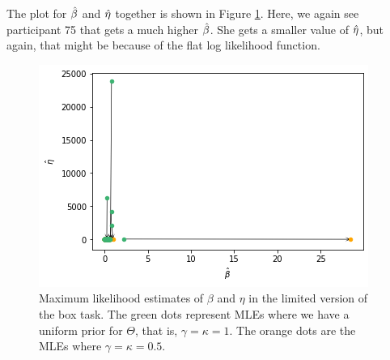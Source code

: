 The plot for $\hat{\beta}$ and $\hat{\eta}$ together is shown in Figure \ref{fig:sensitivity_mles_lim_b_e}. Here, we again see participant 75 that gets a much higher $\hat{\beta}$. She gets a smaller value of $\hat{\eta}$, but again, that might be because of the flat log likelihood function. 
\begin{figure}
    \centering
    \includegraphics[scale=0.8]{pictures/Sensitivity/mles_lim_b_e.png}
    \caption[MLEs of $\beta$ and $\eta$ for prior with $\gamma=\kappa=1$ and $\gamma=\kappa=0.5$, limited]{
    Maximum likelihood estimates of $\beta$ and $\eta$ in the limited version of the box task. The green dots represent MLEs where we have a uniform prior for $\Theta$, that is, $\gamma=\kappa=1$. The orange dots are the MLEs where $\gamma=\kappa=0.5$.}
    \label{fig:sensitivity_mles_lim_b_e}
\end{figure}

